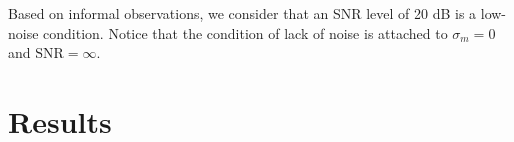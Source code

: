 Based on informal observations, we consider that an SNR level of 20 dB is a low-noise condition.
%
Notice that the condition of lack of noise is attached to $\sigma_m = 0$ and $\text{SNR} = \infty$.


\section{Results}

%
%
%
%
%

